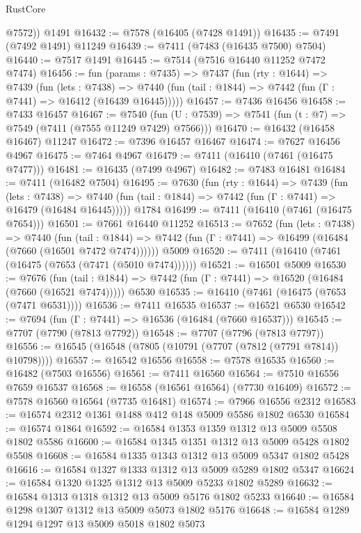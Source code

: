 \begin{lexlean}{RustCore}
\begin{coremodule}
        @7572))
    @1491
@16432 := @7578 (@16405 (@7428 @1491))
@16435 := @7491 (@7492 @1491) @11249
@16439 := @7411 (@7483 (@16435 @7500) @7504)
@16440 := @7517 @1491
@16445 := @7514 (@7516 @16440 @11252 @7472 @7474)
@16456 := fun (params : @7435) =>
  @7437
    (fun (rty : @1644) =>
    @7439
      (fun (lets : @7438) =>
      @7440 (fun (tail : @1844) => @7442 (fun (Γ : @7441) => @16412 (@16439 @16445)))))
@16457 := @7436 @16456
@16458 := @7433 @16457
@16467 := @7540
    (fun (U : @7539) => @7541 (fun (t : @7) => @7549 (@7411 (@7555 @11249 @7429) @7566)))
@16470 := @16432 (@16458 @16467) @11247
@16472 := @7396 @16457 @16467
@16474 := @7627 @16456 @4967
@16475 := @7464 @4967
@16479 := @7411 (@16410 (@7461 (@16475 @7477)))
@16481 := @16435 (@7499 @4967)
@16482 := @7483 @16481
@16484 := @7411 (@16482 @7504)
@16495 := @7630
    (fun (rty : @1644) =>
    @7439
      (fun (lets : @7438) =>
      @7440 (fun (tail : @1844) => @7442 (fun (Γ : @7441) => @16479 (@16484 @16445)))))
    @1784
@16499 := @7411 (@16410 (@7461 (@16475 @7654)))
@16501 := @7661 @16440 @11252
@16513 := @7652
    (fun (lets : @7438) =>
    @7440
      (fun (tail : @1844) =>
      @7442 (fun (Γ : @7441) => @16499 (@16484 (@7660 (@16501 @7472 @7474))))))
    @5009
@16520 := @7411 (@16410 (@7461 (@16475 (@7653 (@7471 (@5010 @7474))))))
@16521 := @16501 @5009
@16530 := @7676
    (fun (tail : @1844) => @7442 (fun (Γ : @7441) => @16520 (@16484 (@7660 (@16521 @7474)))))
    @6530
@16535 := @16410 (@7461 (@16475 (@7653 (@7471 @6531))))
@16536 := @7411 @16535
@16537 := @16521 @6530
@16542 := @7694 (fun (Γ : @7441) => @16536 (@16484 (@7660 @16537)))
@16545 := @7707 (@7790 (@7813 @7792))
@16548 := @7707 (@7796 (@7813 @7797))
@16556 := @16545 (@16548 (@7805 (@10791 (@7707 (@7812 (@7791 @7814)) @10798))))
@16557 := @16542 @16556
@16558 := @7578 @16535
@16560 := @16482 (@7503 @16556)
@16561 := @7411 @16560
@16564 := @7510 @16556 @7659 @16537
@16568 := @16558 (@16561 @16564) (@7730 @16409)
@16572 := @7578 @16560 @16564 (@7735 @16481)
@16574 := @7966 @16556 @2312
@16583 := @16574 @2312 @1361 @1488 @412 @148 @5009 @5586 @1802 @6530
@16584 := @16574 @1864
@16592 := @16584 @1353 @1359 @1312 @13 @5009 @5508 @1802 @5586
@16600 := @16584 @1345 @1351 @1312 @13 @5009 @5428 @1802 @5508
@16608 := @16584 @1335 @1343 @1312 @13 @5009 @5347 @1802 @5428
@16616 := @16584 @1327 @1333 @1312 @13 @5009 @5289 @1802 @5347
@16624 := @16584 @1320 @1325 @1312 @13 @5009 @5233 @1802 @5289
@16632 := @16584 @1313 @1318 @1312 @13 @5009 @5176 @1802 @5233
@16640 := @16584 @1298 @1307 @1312 @13 @5009 @5073 @1802 @5176
@16648 := @16584 @1289 @1294 @1297 @13 @5009 @5018 @1802 @5073

\end{coremodule}
\end{lexlean}

